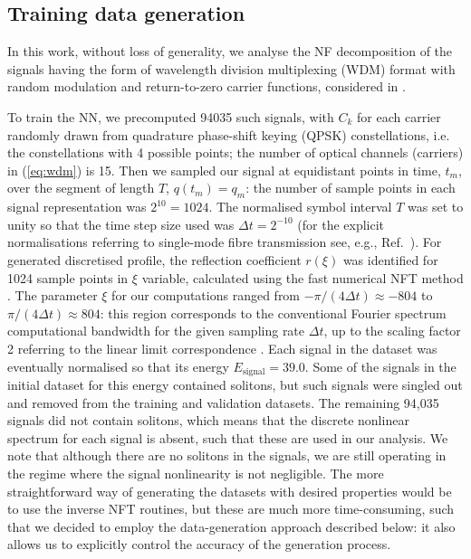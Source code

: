 \subsection{Training data generation}

In this work, without loss of generality, we analyse the NF decomposition of the signals having the form of wavelength division multiplexing (WDM) format with random modulation and return-to-zero carrier functions, considered in \cite{srf18,tsr19}. 

To train the NN, we precomputed 94035 such signals, with $C_k$ for each carrier randomly drawn from quadrature phase-shift keying (QPSK) constellations, i.e. the constellations with 4 possible points; the number of optical channels (carriers) in (\ref{eq:wdm}) is 15. Then we sampled our signal at equidistant points in time, $t_m$, over the segment of length $T$, $q(t_m)=q_m$: the number of sample points in each signal representation was $2^{10}= 1024$. The normalised symbol interval $T$ was set to unity so that the time step size used was $\Delta t = 2^{-10}$ (for the explicit normalisations referring to single-mode fibre transmission see, e.g., Ref.~\cite{tplwfkd17}).
For generated discretised profile, the reflection coefficient $r(\xi)$ was identified for 1024 sample points in $\xi$ variable,  calculated using the fast numerical NFT method \cite{FNFT2018}. The  parameter $\xi$ for our computations ranged from $-\pi / (4 \Delta t) \approx -804$ to $\pi / (4 \Delta t) \approx 804$: this region corresponds to the conventional Fourier spectrum computational bandwidth for the given sampling rate $\Delta t$, up to the scaling factor 2 referring to the linear limit correspondence \cite{pdt13}.
Each signal in the dataset was eventually normalised so that its energy $E_{\text{signal}} = 39.0$. 
Some of the signals in the initial dataset for this energy contained solitons, but such signals were singled out and removed from the training and validation datasets. 
The remaining 94,035 signals did not contain solitons, which means that the discrete nonlinear spectrum for each signal is absent, such that these are used in our analysis.
We note that although there are no solitons in the signals, we are still operating in the regime where the signal nonlinearity is not negligible. The more straightforward way of generating the datasets with desired properties would be to use the inverse NFT routines, but these are much more time-consuming, such that we decided to employ the data-generation approach described below: it also allows us to explicitly control the accuracy of the generation process. 



